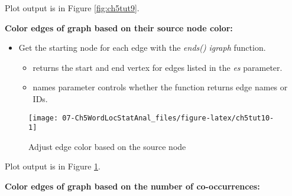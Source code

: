 \documentclass[
]{article}
\newenvironment{Shaded}{\begin{snugshade}}{\end{snugshade}}
\newcommand{\AttributeTok}[1]{\textcolor[rgb]{0.13,0.29,0.53}{#1}}
\newcommand{\DecValTok}[1]{\textcolor[rgb]{0.00,0.00,0.81}{#1}}
\newcommand{\FunctionTok}[1]{\textcolor[rgb]{0.13,0.29,0.53}{\textbf{#1}}}
\newcommand{\NormalTok}[1]{#1}
\newcommand{\OtherTok}[1]{\textcolor[rgb]{0.56,0.35,0.01}{#1}}
\newcommand{\SpecialCharTok}[1]{\textcolor[rgb]{0.81,0.36,0.00}{\textbf{#1}}}
\newcommand{\StringTok}[1]{\textcolor[rgb]{0.31,0.60,0.02}{#1}}
\providecommand{\tightlist}{%
  \setlength{\itemsep}{0pt}\setlength{\parskip}{0pt}}
\begin{document}
Plot output is in Figure \ref{fig:ch5tut9}.

\textbf{Color edges of graph based on their source node color:}

\begin{itemize}
\tightlist
\item
  Get the starting node for each edge with the \emph{ends()} \emph{igraph} function.

  \begin{itemize}
  \tightlist
  \item
    returns the start and end vertex for edges listed in the \emph{es} parameter.
  \item
    names parameter controls whether the function returns edge names or IDs.
  \end{itemize}
\end{itemize}

\begin{Shaded}
\end{Shaded}

\begin{figure}

{\centering \texttt{[image: 07-Ch5WordLocStatAnal\_files/figure-latex/ch5tut10-1]} 

}

\caption{Adjust edge color based on the source node}\label{fig:ch5tut10}
\end{figure}

Plot output is in Figure \ref{fig:ch5tut10}.

\textbf{Color edges of graph based on the number of co-occurrences:}

\begin{Shaded}
\end{Shaded}
\end{document}
